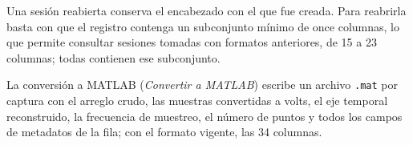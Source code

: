 Una sesión reabierta conserva el encabezado con el que fue creada. Para
reabrirla basta con que el registro contenga un subconjunto mínimo de
once columnas, lo que permite consultar sesiones tomadas con formatos
anteriores, de 15 a 23 columnas; todas contienen ese subconjunto.

La conversión a MATLAB (\textit{Convertir a MATLAB}) escribe un archivo
\texttt{.mat} por captura con el arreglo crudo, las muestras convertidas
a volts, el eje temporal reconstruido, la frecuencia de muestreo, el
número de puntos y todos los campos de metadatos de la fila; con el
formato vigente, las 34 columnas.
